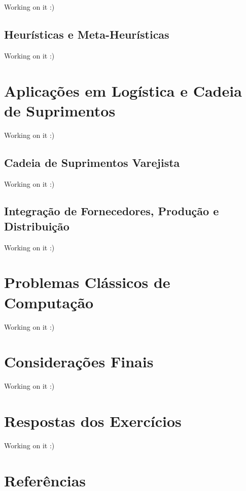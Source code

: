 \documentclass[
]{book}
\begin{document}
Working on it :)

\hypertarget{heuruxedsticas-e-meta-heuruxedsticas}{%
\section{Heurísticas e Meta-Heurísticas}\label{heuruxedsticas-e-meta-heuruxedsticas}}

Working on it :)

\hypertarget{aplicauxe7uxf5es-em-loguxedstica-e-cadeia-de-suprimentos}{%
\chapter{Aplicações em Logística e Cadeia de Suprimentos}\label{aplicauxe7uxf5es-em-loguxedstica-e-cadeia-de-suprimentos}}

Working on it :)

\hypertarget{cadeia-de-suprimentos-varejista}{%
\section{Cadeia de Suprimentos Varejista}\label{cadeia-de-suprimentos-varejista}}

Working on it :)

\hypertarget{integrauxe7uxe3o-de-fornecedores-produuxe7uxe3o-e-distribuiuxe7uxe3o}{%
\section{Integração de Fornecedores, Produção e Distribuição}\label{integrauxe7uxe3o-de-fornecedores-produuxe7uxe3o-e-distribuiuxe7uxe3o}}

Working on it :)

\hypertarget{problemas-cluxe1ssicos-de-computauxe7uxe3o}{%
\chapter{Problemas Clássicos de Computação}\label{problemas-cluxe1ssicos-de-computauxe7uxe3o}}

Working on it :)

\hypertarget{considerauxe7uxf5es-finais}{%
\chapter*{Considerações Finais}\label{considerauxe7uxf5es-finais}}

Working on it :)

\hypertarget{respostas-dos-exercuxedcios}{%
\chapter*{Respostas dos Exercícios}\label{respostas-dos-exercuxedcios}}

Working on it :)

\hypertarget{referuxeancias}{%
\chapter*{Referências}\label{referuxeancias}}
\end{document}
